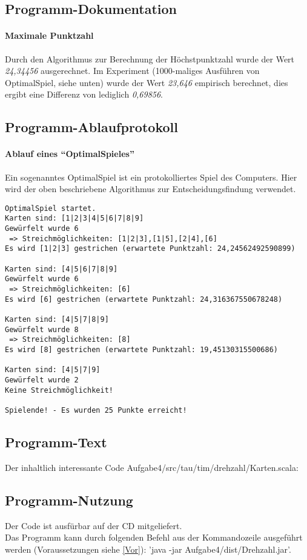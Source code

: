 \subsection{Programm-Dokumentation}

\paragraph{Maximale Punktzahl}
Durch den Algorithmus zur Berechnung der Höchstpunktzahl wurde der Wert \emph{24,34456} ausgerechnet.
Im Experiment (1000-maliges Ausführen von OptimalSpiel, siehe unten) wurde der Wert \emph{23,646} empirisch berechnet,
dies ergibt eine Differenz von lediglich \emph{0,69856}.

\subsection{Programm-Ablaufprotokoll}
\paragraph{Ablauf eines ``OptimalSpieles''}
Ein sogenanntes OptimalSpiel ist ein protokolliertes Spiel des Computers. Hier wird der oben beschriebene Algorithmus zur Entscheidungsfindung verwendet.
\lstset{language=Scala}
\begin{lstlisting}
OptimalSpiel startet.
Karten sind: [1|2|3|4|5|6|7|8|9]
Gewürfelt wurde 6
 => Streichmöglichkeiten: [1|2|3],[1|5],[2|4],[6]
Es wird [1|2|3] gestrichen (erwartete Punktzahl: 24,24562492590899)

Karten sind: [4|5|6|7|8|9]
Gewürfelt wurde 6
 => Streichmöglichkeiten: [6]
Es wird [6] gestrichen (erwartete Punktzahl: 24,316367550678248)

Karten sind: [4|5|7|8|9]
Gewürfelt wurde 8
 => Streichmöglichkeiten: [8]
Es wird [8] gestrichen (erwartete Punktzahl: 19,45130315500686)

Karten sind: [4|5|7|9]
Gewürfelt wurde 2
Keine Streichmöglichkeit!

Spielende! - Es wurden 25 Punkte erreicht!
\end{lstlisting}

\subsection{Programm-Text}
Der inhaltlich interessante Code Aufgabe4/src/tau/tim/drehzahl/Karten.scala:
\lstset{language=Scala}
\lstset{basicstyle=\footnotesize}

\subsection{Programm-Nutzung}
Der Code ist ausfürbar auf der CD mitgeliefert. \\
Das Programm kann durch folgenden Befehl aus der Kommandozeile ausgeführt werden (Voraussetzungen siehe \ref{Vor}):
'java -jar Aufgabe4/dist/Drehzahl.jar'.